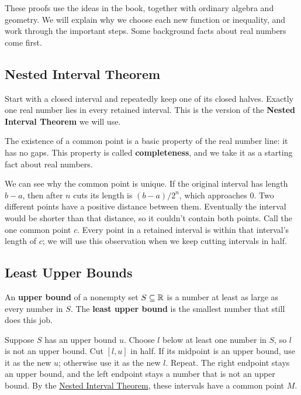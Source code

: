 \label{sec:selected-proofs}

These proofs use the ideas in the book, together with ordinary algebra
and geometry. We will explain why we choose each new function or
inequality, and work through the important steps. Some background facts
about real numbers come first.

\label{sec:real-number-tools}

\subsection*{Nested Interval Theorem}
\label{sec:nested-interval-theorem}

Start with a closed interval and repeatedly keep one of its closed
halves. Exactly one real number lies in every retained interval.
This is the version of the \textbf{Nested Interval Theorem} we will use.

The existence of a common point is a basic property of the real number
line: it has no gaps. This property is called \textbf{completeness}, and
we take it as a starting fact about real numbers.

We can see why the common point is unique. If the original interval has
length $b-a$, then after $n$ cuts its length is $(b-a)/2^n$, which
approaches 0. Two different points have a positive distance between them.
Eventually the interval would be shorter than that distance, so it
couldn't contain both points. Call the one common point $c$.
Every point in a retained interval is within that interval's length of
$c$; we will use this observation when we keep cutting intervals in half.

\subsection*{Least Upper Bounds}
\label{sec:least-upper-bounds}

An \textbf{upper bound} of a nonempty set $S\subseteq\mathbb{R}$ is a number
at least as large as every number in $S$. The \textbf{least upper bound}
is the smallest number that still does this job.

Suppose $S$ has an upper bound $u$. Choose $l$ below at least one number
in $S$, so $l$ is not an upper bound. Cut $[l,u]$ in half. If its midpoint
is an upper bound, use it as the new $u$; otherwise use it as the new $l$.
Repeat. The right endpoint stays an upper bound, and the left endpoint
stays a number that is not an upper bound. By the
\hyperref[sec:nested-interval-theorem]{Nested Interval Theorem}, these
intervals have a common point $M$.

